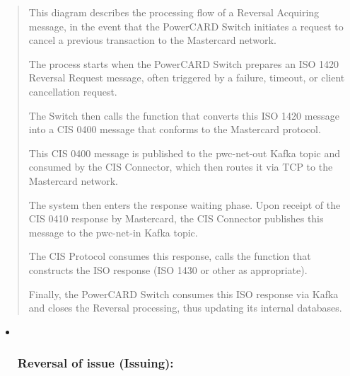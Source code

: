 \documentclass[12pt,a4paper]{report}
\begin{document}
\begin{quote}
This diagram describes the processing flow of a Reversal Acquiring
message, in the event that the PowerCARD Switch initiates a request to
cancel a previous transaction to the Mastercard network.

The process starts when the PowerCARD Switch prepares an ISO 1420
Reversal Request message, often triggered by a failure, timeout, or
client cancellation request.

The Switch then calls the function that converts this ISO 1420 message
into a CIS 0400 message that conforms to the Mastercard protocol.

This CIS 0400 message is published to the pwc-net-out Kafka topic and
consumed by the CIS Connector, which then routes it via TCP to the
Mastercard network.

The system then enters the response waiting phase. Upon receipt of the
CIS 0410 response by Mastercard, the CIS Connector publishes this
message to the pwc-net-in Kafka topic.

The CIS Protocol consumes this response, calls the function that
constructs the ISO response (ISO 1430 or other as appropriate).

Finally, the PowerCARD Switch consumes this ISO response via Kafka and
closes the Reversal processing, thus updating its internal databases.
\end{quote}

\begin{itemize}
\item ~
  \hypertarget{reversal-of-issue-issuing}{%
  \subsubsection{\texorpdfstring{\textbf{Reversal of issue
  (Issuing):}}{Reversal of issue (Issuing):}}\label{reversal-of-issue-issuing}}
\end{itemize}
\end{document}
